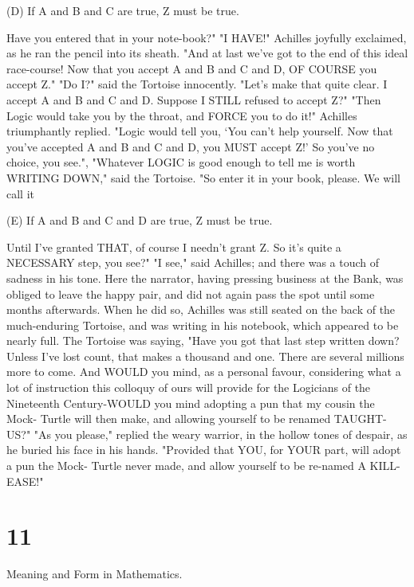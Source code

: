 (D) If A and B and C are true, Z must be true. 

Have you entered that in your note-book?" "I HAVE!" Achilles joyfully exclaimed, as he ran the pencil into its sheath. "And at last we've got to the end of this ideal race-course! Now that you accept A and B and C and D, OF COURSE you accept Z." "Do I?" said the Tortoise innocently. "Let's make that quite clear. I accept A and B and C and D. Suppose I STILL refused to accept Z?" "Then Logic would take you by the throat, and FORCE you to do it!" Achilles triumphantly replied. "Logic would tell you, `You can't help yourself. Now that you've accepted A and B and C and D, you MUST accept Z!' So you've no choice, you see.", "Whatever LOGIC is good enough to tell me is worth WRITING DOWN," said the Tortoise. "So enter it in your book, please. We will call it 

(E) If A and B and C and D are true, Z must be true. 

Until I've granted THAT, of course I needn't grant Z. So it's quite a NECESSARY step, you see?" "I see," said Achilles; and there was a touch of sadness in his tone. Here the narrator, having pressing business at the Bank, was obliged to leave the happy pair, and did not again pass the spot until some months afterwards. When he did so, Achilles was still seated on the back of the much-enduring Tortoise, and was writing in his notebook, which appeared to be nearly full. The Tortoise was saying, "Have you got that last step written down? Unless I've lost count, that makes a thousand and one. There are several millions more to come. And WOULD you mind, as a personal favour, considering what a lot of instruction this colloquy of ours will provide for the Logicians of the Nineteenth Century-WOULD you mind adopting a pun that my cousin the Mock- Turtle will then make, and allowing yourself to be renamed TAUGHT-US?" "As you please," replied the weary warrior, in the hollow tones of despair, as he buried his face in his hands. "Provided that YOU, for YOUR part, will adopt a pun the Mock- Turtle never made, and allow yourself to be re-named A KILL-EASE!" 








\chapter {11}




Meaning and Form in Mathematics. 

